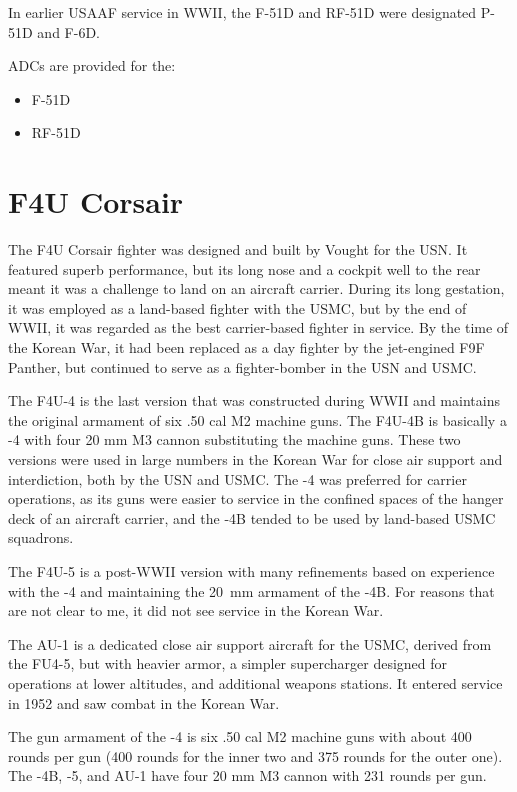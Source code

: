 In earlier USAAF service in WWII, the F-51D and RF-51D were designated P-51D and F-6D.

ADCs are provided for the:
\begin{itemize}
\item F-51D
\item RF-51D
\end{itemize}

\section*{F4U Corsair}

The F4U Corsair fighter was designed and built by Vought for the USN. It featured superb performance, but its long nose and a cockpit well to the rear meant it was a challenge to land on an aircraft carrier. During its long gestation, it was employed as a land-based fighter with the USMC, but by the end of WWII, it was regarded as the best carrier-based fighter in service. By the time of the Korean War, it had been replaced as a day fighter by the jet-engined F9F Panther, but continued to serve as a fighter-bomber in the USN and USMC.

The F4U-4 is the last version that was constructed during WWII and maintains the original armament of six .50 cal M2 machine guns. The F4U-4B is basically a -4 with four 20 mm M3 cannon substituting the machine guns. These two versions were used in large numbers in the Korean War for close air support and interdiction, both by the USN and USMC. The -4 was preferred for carrier operations, as its guns were easier to service in the confined spaces of the hanger deck of an aircraft carrier, and the -4B tended to be used by land-based USMC squadrons.

The F4U-5 is a post-WWII version with many refinements based on experience with the -4 and maintaining the 20~mm armament of the -4B. For reasons that are not clear to me, it did not see service in the Korean War.

The AU-1 is a dedicated close air support aircraft for the USMC, derived from the FU4-5, but with heavier armor, a simpler supercharger designed for operations at lower altitudes, and additional weapons stations. It entered service in 1952 and saw combat in the Korean War.

The gun armament of the -4 is six .50 cal M2 machine guns with about 400 rounds per gun (400 rounds for the inner two and 375 rounds for the outer one). The -4B, -5, and AU-1 have four 20 mm M3 cannon with 231 rounds per gun. 

